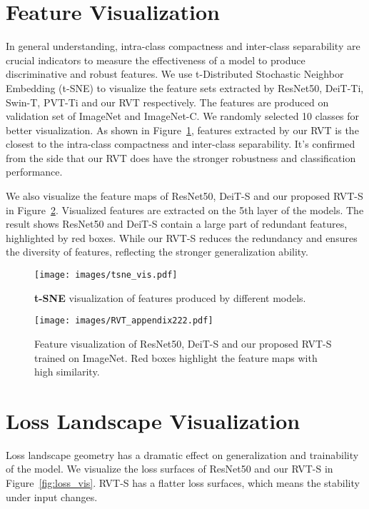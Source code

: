 \documentclass[10pt,twocolumn,letterpaper]{article}
\begin{document}
\section{Feature Visualization}
In general understanding, intra-class compactness and inter-class separability are crucial indicators to measure the effectiveness of a model to
produce discriminative and robust features. We use t-Distributed Stochastic Neighbor Embedding (t-SNE) to visualize the feature sets extracted by ResNet50, DeiT-Ti, Swin-T, PVT-Ti and our RVT respectively. The features are produced on validation set of ImageNet and ImageNet-C. We randomly selected 10 classes for better visualization. As shown in Figure~\ref{fig:tsne_vis}, features extracted by our RVT is the closest to the intra-class compactness and inter-class separability. It's confirmed from the side that our RVT does have the stronger robustness and classification performance. 

We also visualize the feature maps of ResNet50, DeiT-S and our proposed RVT-S in Figure~\ref{fig:feature_vis}. Visualized features are extracted on the 5th layer of the models. The result shows ResNet50 and DeiT-S contain a large part of redundant features, highlighted by red boxes. While our RVT-S reduces the redundancy and ensures the diversity of features, reflecting the stronger generalization ability.

\begin{figure}
    \centering
    \texttt{[image: images/tsne\_vis.pdf]}
    \vspace{-4mm}
    \caption{\textbf{t-SNE} visualization of features produced by different models.}
    \label{fig:tsne_vis}
\end{figure}

\begin{figure}
    \centering
    \texttt{[image: images/RVT\_appendix222.pdf]}
    \vspace{-4mm}
    \caption{Feature visualization of ResNet50, DeiT-S and our proposed RVT-S trained on ImageNet. Red boxes highlight the feature maps with high similarity. }
    \label{fig:feature_vis}
\end{figure}

\section{Loss Landscape Visualization}
Loss landscape geometry has a dramatic effect on generalization and trainability of the model. We visualize the loss surfaces of ResNet50 and our RVT-S in Figure~\ref{fig:loss_vis}. RVT-S has a flatter loss surfaces, which means the stability under input changes.
\end{document}
